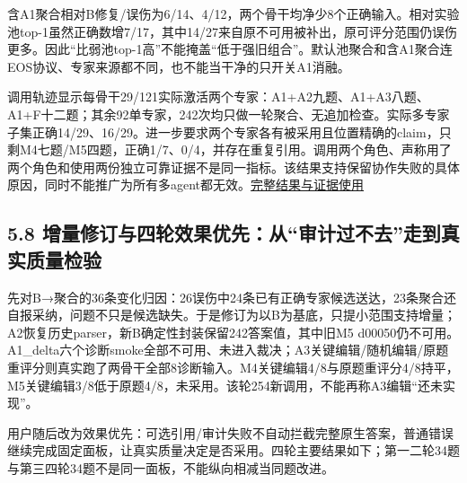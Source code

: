 \documentclass[
  11pt,
  a4paper,
]{article}
\begin{document}
含A1聚合相对B修复/误伤为6/14、4/12，两个骨干均净少8个正确输入。相对实验池top-1虽然正确数增7/17，其中14/27来自原不可用被补出，原可评分范围仍误伤更多。因此``比弱池top-1高''不能掩盖``低于强旧组合''。默认池聚合和含A1聚合连EOS协议、专家来源都不同，也不能当干净的只开关A1消融。

调用轨迹显示每骨干29/121实际激活两个专家：A1+A2九题、A1+A3八题、A1+F十二题；其余92单专家，242次均只做一轮聚合、无追加检查。实际多专家子集正确14/29、16/29。进一步要求两个专家各有被采用且位置精确的claim，只剩M4七题/M5四题，正确1/7、0/4，并存在重复引用。调用两个角色、声称用了两个角色和使用两份独立可靠证据不是同一指标。该结果支持保留协作失败的具体原因，同时不能推广为所有多agent都无效。\href{https://github.com/xiotakut/cf_mrg/blob/main/papers/2026-10-02_cf_moa/author_dossier/records/research/cf_moa_experiment_report.md\#L921}{完整结果与证据使用}

\subsection{5.8
增量修订与四轮效果优先：从``审计过不去''走到真实质量检验}\label{ux589eux91cfux4feeux8ba2ux4e0eux56dbux8f6eux6548ux679cux4f18ux5148ux4eceux5ba1ux8ba1ux8fc7ux4e0dux53bbux8d70ux5230ux771fux5b9eux8d28ux91cfux68c0ux9a8c}

先对B→聚合的36条变化归因：26误伤中24条已有正确专家候选送达，23条聚合还自报采纳，问题不只是候选缺失。于是修订为以B为基底，只提小范围支持增量；A2恢复历史parser，新B确定性封装保留242答案值，其中旧M5
d00050仍不可用。A1\_delta六个诊断smoke全部不可用、未进入裁决；A3关键编辑/随机编辑/原题重评分则真实跑了两骨干全部8诊断输入。M4关键编辑4/8与原题重评分4/8持平，M5关键编辑3/8低于原题4/8，未采用。该轮254新调用，不能再称A3编辑``还未实现''。

用户随后改为效果优先：可选引用/审计失败不自动拦截完整原生答案，普通错误继续完成固定面板，让真实质量决定是否采用。四轮主要结果如下；第一二轮34题与第三四轮34题不是同一面板，不能纵向相减当同题改进。
\end{document}
